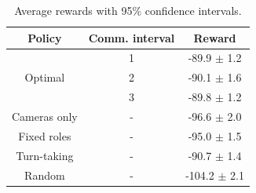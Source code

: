 \begin{table}[]
\centering
\caption{Average rewards with 95\% confidence intervals.}
\label{tab:rewards}
\begin{tabular}{@{}ccc@{}}
\toprule
Policy             & Comm. interval & Reward \\ \midrule
\multirow{3}{*}{Optimal} & 1  &  -89.9 $\pm$ 1.2    \\
                   & 2  & -90.1 $\pm$ 1.6   \\
                   & 3  &  -89.8 $\pm$ 1.2    \\ \midrule
Cameras only        & - &  -96.6 $\pm$ 2.0    \\
Fixed roles        & - &  -95.0 $\pm$ 1.5   \\
Turn-taking        & - &  -90.7 $\pm$ 1.4   \\
Random             & - &  -104.2 $\pm$ 2.1   \\ \bottomrule
\end{tabular}
\end{table}

